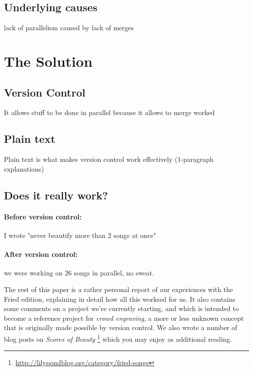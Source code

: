 \documentclass[11pt,a4paper]{article}
\begin{document}
\subsection{Underlying causes}
lack of parallelism caused by lack of merges


\section{The Solution}

\subsection{Version Control}
It allows stuff to be done in parallel because it allows to merge worked

\subsection{Plain text}
Plain text is what makes version control work effectively
(1-paragraph explanations)

\subsection{Does it really work?}

\paragraph{Before version control:}
I wrote "never beautify more than 2 songs at once"

\paragraph{After version control:}
we were working on 26 songs in parallel, no sweat.

\medskip
The rest of this paper is a rather personal report of our experiences with the Fried
edition, explaining in detail how all this worksed for us.  It also contains
some comments on a project we're currently starting, and which is intended to become
a reference project for \emph{crowd engraving}, a more or less unknown concept that is
originally made possible by version control. We also wrote a number of blog posts on
\emph{Scores of Beauty}%
\footnote{\url{http://lilypondblog.org/category/fried-songs}}
which you may enjoy as additional reading.
\end{document}
